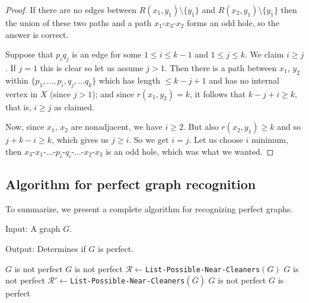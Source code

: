 \begin{proof}
	If there are no edges between $R(x_1, y_1) \setminus \{y_1\}$ and $R(x_2, y_1) \setminus \{y_1\}$ then the union of these two paths and a path $x_1$-$x_3$-$x_2$ forms an odd hole, so the answer is correct.

	Suppose that $p_iq_j$ is an edge for some $1\leq i \leq k-1$ and $1 \leq j \leq k$. We claim $i \geq j$. If $j = 1$ this is clear so let us assume $j > 1$. Then there is a path between $x_1$, $y_2$ within $\{p_1, \ldots , p_i, q_j, \ldots q_k\}$ which has length $\leq k-j+1$ and has no internal vertex in $X$ (since $j > 1$); and since $r(x_1, y_2) = k$, it follows that $k-j+i \geq k$, that is, $i \geq j$ as claimed.

	Now, since $x_1$, $x_2$ are nonadjacent, we have $i \geq 2$. But also $r(x_2, y_1) \geq k$ and so $j+k-i \geq k$, which gives us $j \geq i$. So we get $i=j$. Let us choose $i$ minimum, then $x_3$-$x_1$-$\ldots$-$p_i$-$q_i$-$\ldots$-$x_2$-$x_3$ is an odd hole, which was what we wanted.
\end{proof}

\subsection{Algorithm for perfect graph recognition}

To summarize, we present a complete algorithm for recognizing perfect graphs.
\begin{alg}
	\label{alg:testNearCleaner}
	Input: A graph $G$.

	\noindent Output: Determines if $G$ is perfect.
	\label{alg:bergeness}
\end{alg}

\begin{algorithmic}[1]
			\ls \RETURN $G$ is not perfect
		\mEndIf
			\ls \RETURN $G$ is not perfect
		\mEndIf \label{line:simpleEnd}
		\ls $\mathcal{R} \gets $\texttt{List-Possible-Near-Cleaners}$(G)$ \label{line:getR}
		 \label{line:testXStart}
				\ls \RETURN $G$ is not perfect
			\mEndIf
		\mEndFor \label{line:testXEnd}
		\ls $\mathcal{R'} \gets $\texttt{List-Possible-Near-Cleaners}$(\overline{G})$
				\ls \RETURN $G$ is not perfect
			\mEndIf
		\mEndFor
		\ls \RETURN $G$ is perfect
	\mEndProcedure
\end{algorithmic}

